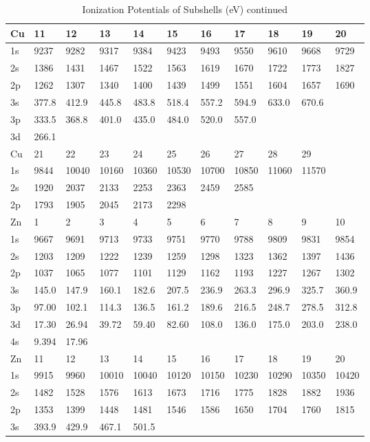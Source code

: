 \begin{table}
\caption{Ionization Potentials of Subshells (eV) continued}
\begin{tabular}{lllllllllll}
\hline
Cu&  11&  12&  13&  14&  15&  16&  17&  18&  19&  20\\
\hline
1s&  9237&  9282&  9317&  9384&  9423&
9493&  9550&  9610&  9668&  9729\\
2s&  1386&  1431&  1467&  1522&  1563&  1619&  1670&
1722&  1773&  1827\\
2p&  1262&  1307&  1340&  1400&  1439&  1499&  1551&  1604&  1657&
1690\\
3s& 377.8& 412.9& 445.8& 483.8& 518.4& 557.2& 594.9& 633.0& 670.6\\
3p& 333.5&
368.8&
401.0& 435.0& 484.0& 520.0& 557.0\\
3d& 266.1\\
\hline
Cu&  21&  22&  23&  24&  25&  26&  27&  28&
29\\
\hline
1s&  9844& 10040& 10160& 10360& 10530& 10700& 10850& 11060& 11570\\
2s&  1920&  2037&
2133&  2253&  2363&  2459&  2585\\
2p&  1793&  1905&  2045&  2173&  2298\\
\hline
Zn&   1&   2&
3&  4&   5&   6&   7&   8&   9&  10\\
\hline
1s&  9667&  9691&  9713&  9733&  9751&  9770&  9788&
9809&  9831&  9854\\
2s&  1203&  1209&  1222&  1239&  1259&  1298&  1323&  1362&  1397&
1436\\
2p&  1037&  1065&  1077&  1101&  1129&  1162&  1193&  1227&  1267&  1302\\
3s&
145.0&
147.9& 160.1& 182.6& 207.5& 236.9& 263.3& 296.9& 325.7& 360.9\\
3p& 97.00&
102.1& 114.3&
136.5& 161.2& 189.6& 216.5& 248.7& 278.5& 312.8\\
3d& 17.30& 26.94& 39.72& 59.40& 82.60&
108.0& 136.0& 175.0& 203.0& 238.0\\
4s& 9.394& 17.96\\
\hline
Zn&  11&  12&  13&  14&  15&  16&  17&
18&  19&  20\\
\hline
1s&  9915&  9960& 10010& 10040& 10120& 10150& 10230& 10290& 10350& 10420\\
2s&
1482&  1528&  1576&  1613&  1673&  1716&  1775&  1828&  1882&  1936\\
2p&
1353&  1399&
1448&  1481&  1546&  1586&  1650&  1704&  1760&  1815\\
3s& 393.9& 429.9& 467.1& 501.5&

\end{tabular}
\end{table}

